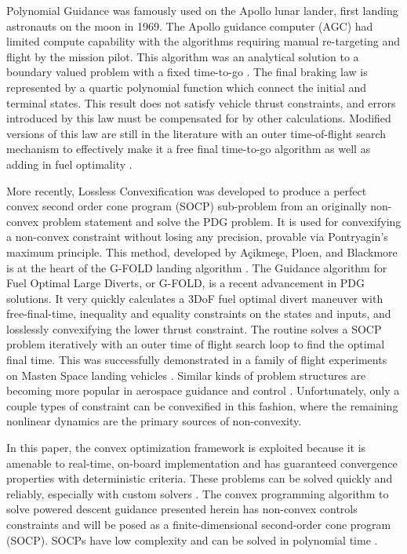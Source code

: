 \documentclass[conf]{new-aiaa}
\begin{document}
Polynomial Guidance was famously used on the Apollo lunar lander, first landing astronauts on the moon in 1969. The Apollo guidance computer (AGC) had limited compute capability with the algorithms requiring manual re-targeting and flight by the mission pilot. This algorithm was an analytical solution to a boundary valued problem with a fixed time-to-go \cite{klumpp1974apollo}. The final braking law is represented by a quartic polynomial function which connect the initial and terminal states. This result does not satisfy vehicle thrust constraints, and errors introduced by this law must be compensated for by other calculations. Modified versions of this law are still in the literature with an outer time-of-flight search mechanism to effectively make it a free final time-to-go algorithm as well as adding in fuel optimality \cite{d1997optimal}.

More recently, Lossless Convexification was developed to produce a perfect convex second order cone program (SOCP) sub-problem from an originally non-convex problem statement and solve the PDG problem. It is used for convexifying a non-convex constraint without losing any precision, provable via Pontryagin's maximum principle. This method, developed by Açikmeşe, Ploen, and Blackmore is at the heart of the G-FOLD landing algorithm \cite{blackmore2010minimum} \cite{accikmecse2011lossless} \cite{acikmese2012g}. The Guidance algorithm for Fuel Optimal Large Diverts, or G-FOLD, is a recent advancement in PDG solutions. It very quickly calculates a 3DoF fuel optimal divert maneuver with free-final-time, inequality and equality constraints on the states and inputs, and losslessly convexifying the lower thrust constraint. The routine solves a SOCP problem iteratively with an outer time of flight search loop to find the optimal final time. This was successfully demonstrated in a family of flight experiments on Masten Space landing vehicles \cite{acikmese2013flight} \cite{scharf2014adapt}. Similar kinds of problem structures are becoming more popular in aerospace guidance and control \cite{LiuSurvey2017} \cite{wang_paper}. Unfortunately, only a couple types of constraint can be convexified in this fashion, where the remaining nonlinear dynamics are the primary sources of non-convexity.

In this paper, the convex optimization framework is exploited because it is amenable to real-time, on-board implementation and has guaranteed convergence properties with deterministic criteria. These problems can be solved quickly and reliably, especially with custom solvers \cite{dueri2014automated}. The convex programming algorithm to solve powered descent guidance presented herein has non-convex controls constraints and will be posed as a finite-dimensional second-order cone program (SOCP). SOCPs have low complexity and can be solved in polynomial time \cite{nesterov1994interior} \cite{boyd2004convex}.
\end{document}
